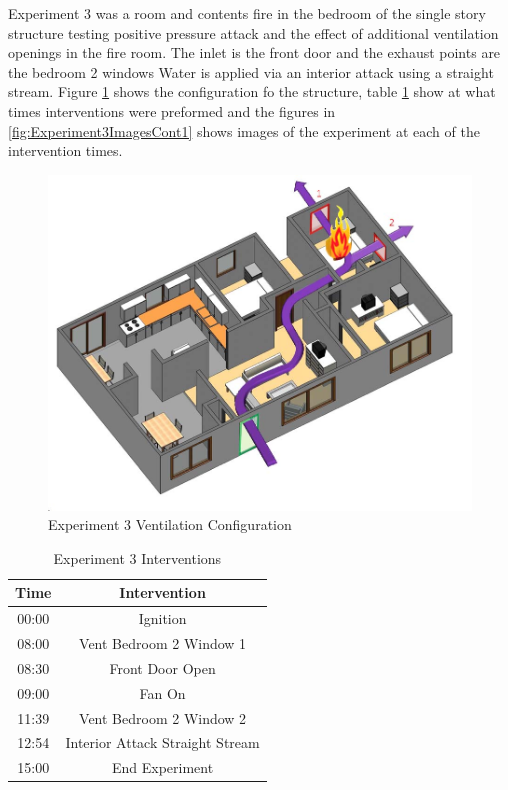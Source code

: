 \documentclass{article}
\begin{document}
Experiment 3 was a room and contents fire in the bedroom of the single story structure testing positive pressure attack and the effect of additional ventilation openings in the fire room. The inlet is the front door and the exhaust points are the bedroom 2 windows Water is applied via an interior attack using a straight stream. Figure \ref{fig:Exp3VentConfig} shows the configuration fo the structure, table \ref{Table:Exp3Interventions} show at what times interventions were preformed and the figures in \ref{fig:Experiment3ImagesCont1} shows images of the experiment at each of the intervention times.

 \begin{figure}[h!]
 	\centering
 	\includegraphics[width=5in]{0_Images/FireExperiments/Single_Story/Experiment_3.jpg}
 	\caption{Experiment 3 Ventilation Configuration}
 	\label{fig:Exp3VentConfig}
 \end{figure}

\begin{table}[H]
	\centering
	\caption{Experiment 3 Interventions}
	\begin{tabular}{|c|c|} 
		\hline
		Time & Intervention \\ \hline \hline
		00:00 & Ignition \\ \hline
		08:00 & Vent Bedroom 2 Window 1 \\ \hline
		08:30 & Front Door Open \\ \hline
		09:00 & Fan On \\ \hline
		11:39 & Vent Bedroom 2 Window 2 \\ \hline
		12:54 & Interior Attack Straight Stream \\ \hline
		15:00 & End Experiment \\ \hline
	\end{tabular}
	\label{Table:Exp3Interventions}
\end{table}
\end{document}
